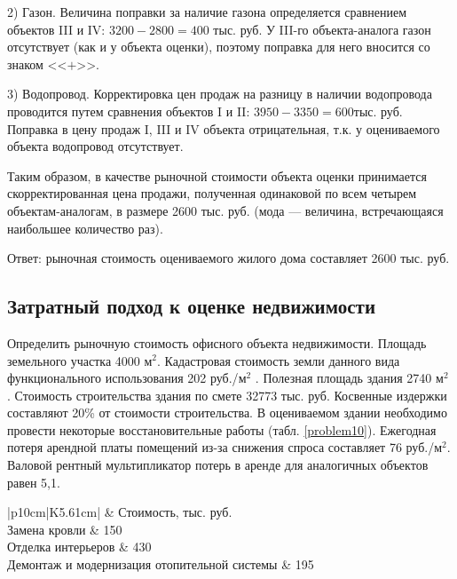 2) Газон.
Величина поправки за наличие газона определяется сравнением объектов III и IV: $ 3200 - 2800 = 400 $ тыс. руб.
У III-го объекта-аналога газон отсутствует (как и у объекта оценки), поэтому поправка для него вносится со знаком  <<$+$>>.

3) Водопровод.
Корректировка цен продаж на разницу в наличии водопровода проводится путем сравнения объектов I и II: $ 3950 - 3350 = 600  $тыс. руб.
Поправка в цену продаж I, III и IV объекта отрицательная, т.к. у оцениваемого объекта водопровод отсутствует.

Таким образом, в качестве рыночной стоимости объекта оценки принимается скорректированная цена продажи, полученная одинаковой по всем четырем объектам-аналогам, в размере 2600 тыс. руб. (мода --- величина, встречающаяся наибольшее количество раз).

Ответ: рыночная стоимость оцениваемого жилого дома составляет 2600 тыс. руб.

\subsection{Затратный подход к оценке недвижимости}

Определить рыночную стоимость офисного объекта недвижимости.
Площадь земельного участка 4000 $\text{м}^2$.
Кадастровая стоимость земли данного вида функционального использования 202 руб./$\text{м}^2$ .
Полезная площадь здания 2740 $\text{м}^2$ .
Стоимость строительства здания по смете 32773 тыс. руб.
Косвенные издержки составляют 20\% от стоимости строительства.
В оцениваемом здании необходимо провести некоторые восстановительные работы (табл. \ref{problem10}).
Ежегодная потеря арендной платы помещений из-за снижения спроса составляет 76 руб./$\text{м}^2$.
Валовой рентный мультипликатор потерь в аренде для аналогичных объектов равен 5,1.

\begin{table}
	\small
	\centering
	\caption{Восстановительные работы, требующиеся в оцениваемом здании}
	\label{problem10}
	\setlength{\extrarowheight}{1.2mm}
	\begin{tabularx}{\textwidth}{|p{10cm}|K{5.61cm}|}
		\hline
		 & Стоимость, тыс. руб. \\ \hline
		Замена кровли & 150 \\ \hline
		Отделка интерьеров & 430 \\ \hline
		Демонтаж и модернизация отопительной системы & 195 \\ \hline
	\end{tabularx}
\end{table}

